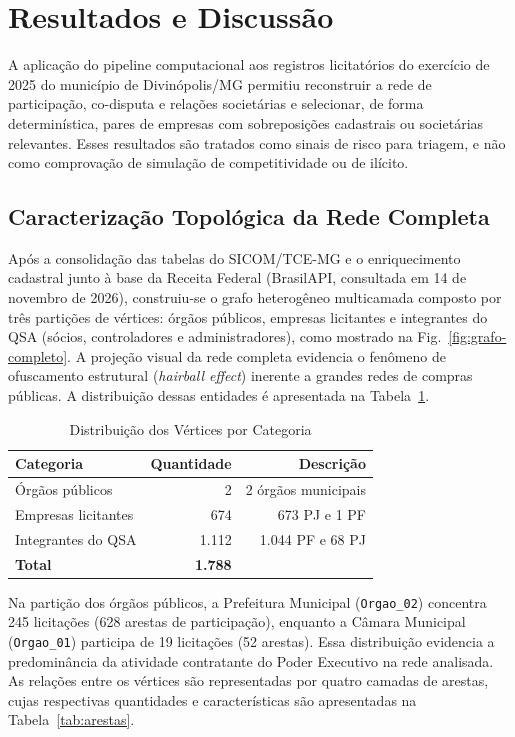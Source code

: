 \section{Resultados e Discussão}
\label{sec:resultados}

A aplicação do pipeline computacional aos registros licitatórios do exercício de 2025 do município de Divinópolis/MG permitiu reconstruir a rede de participação, co-disputa e relações societárias e selecionar, de forma determinística, pares de empresas com sobreposições cadastrais ou societárias relevantes. Esses resultados são tratados como sinais de risco para triagem, e não como comprovação de simulação de competitividade ou de ilícito.

\subsection{Caracterização Topológica da Rede Completa}

Após a consolidação das tabelas do SICOM/TCE-MG e o enriquecimento cadastral junto à base da Receita Federal (BrasilAPI, consultada em 14 de novembro de 2026), construiu-se o grafo heterogêneo multicamada composto por três partições de vértices: órgãos públicos, empresas licitantes e integrantes do QSA (sócios, controladores e administradores), como mostrado na Fig.~\ref{fig:grafo-completo}. A projeção visual da rede completa evidencia o fenômeno de ofuscamento estrutural (\emph{hairball effect}) inerente a grandes redes de compras públicas. A distribuição dessas entidades é apresentada na Tabela~\ref{tab:vertices}.
\begin{table}[!h]
  \centering
  \caption{Distribuição dos Vértices por Categoria}
  \label{tab:vertices}
  \footnotesize
  \begin{tabular}{lrr}
    \hline
    \textbf{Categoria} & \textbf{Quantidade} & \textbf{Descrição} \\
    \hline
    Órgãos públicos & 2 & 2 órgãos municipais \\
    Empresas licitantes & 674 & 673 PJ e 1 PF \\
    Integrantes do QSA & 1.112 & 1.044 PF e 68 PJ \\
    \hline
    \textbf{Total} & \textbf{1.788} & \\
    \hline
  \end{tabular}
\end{table}

Na partição dos órgãos públicos, a Prefeitura Municipal (\texttt{Orgao\_02}) concentra 245 licitações (628 arestas de participação), enquanto a Câmara Municipal (\texttt{Orgao\_01}) participa de 19 licitações (52 arestas). Essa distribuição evidencia a predominância da atividade contratante do Poder Executivo na rede analisada. As relações entre os vértices são representadas por quatro camadas de arestas, cujas respectivas quantidades e características são apresentadas na Tabela~\ref{tab:arestas}.

